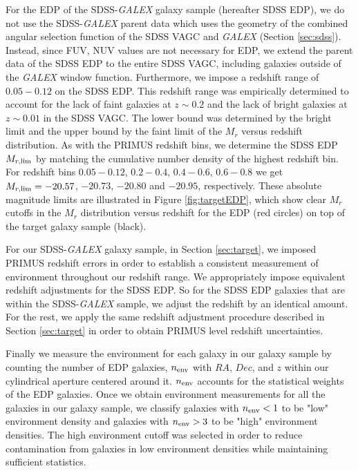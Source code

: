 \documentclass{emulateapj}
\begin{document}
For the EDP of the SDSS-{\em GALEX} galaxy sample (hereafter SDSS EDP), we do not use the SDSS-{\em GALEX} parent data which uses the geometry of the combined angular selection function of the SDSS VAGC and {\em GALEX} (Section \ref{sec:sdss}). Instead, since FUV, NUV values are not necessary for EDP, we extend the parent data of the SDSS EDP to the entire SDSS VAGC, including galaxies outside of the {\em GALEX} window function. Furthermore, we impose a redshift range of $0.05-0.12$ on the SDSS EDP. This redshift range was empirically determined to account for the lack of faint galaxies at $z \sim 0.2$ and the lack of bright galaxies at $z \sim 0.01$ in the SDSS VAGC. The lower bound was determined by the bright limit and the upper bound by the faint limit of the $M_r$ versus redshift distribution. As with the PRIMUS redshift bins, we determine the SDSS EDP $M_{r, \rm{lim}}$ by matching the cumulative number density of the highest redshift bin. For redshift bins $0.05-0.12$, $0.2-0.4$, $0.4-0.6$, $0.6-0.8$ we get $M_{r,\rm{lim}} = -20.57$, $-20.73$, $-20.80$ and $-20.95$, respectively. These absolute magnitude limits are illustrated in Figure \ref{fig:targetEDP}, which show clear $M_r$ cutoffs in the $M_{r}$ distribution versus redshift for the EDP (red circles) on top of the target galaxy sample (black). 

For our SDSS-{\em GALEX} galaxy sample, in Section \ref{sec:target}, we imposed PRIMUS redshift errors in order to establish a consistent measurement of environment throughout our redshift range. We appropriately impose equivalent redshift adjustments for the SDSS EDP. So for the SDSS EDP galaxies that are within the SDSS-{\em GALEX} sample, we adjust the redshift by an identical amount. For the rest, we apply the same redshift adjustment procedure described in Section \ref{sec:target} in order to obtain PRIMUS level redshift uncertainties. 

Finally we measure the environment for each galaxy in our galaxy sample by counting the number of EDP galaxies, $n_{\rm{env}}$ with $RA$, $Dec$, and $z$ within our cylindrical aperture centered around it. $n_{\rm{env}}$ accounts for the statistical weights of the EDP galaxies. Once we obtain environment measurements for all the galaxies in our galaxy sample, we classify galaxies with $n_{\rm{env}} < 1$ to be "low" environment density and galaxies with $n_{\rm{env}} > 3$ to be "high" environment densities. The high environment cutoff was selected in order to reduce contamination from galaxies in low environment densities while maintaining sufficient statistics. 
\end{document}
